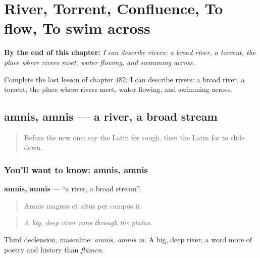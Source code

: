 
\chapter{River, Torrent, Confluence, To flow, To swim across}
\label{ch:la-river-torrent-confluence-to-flow-to-swim-across}

\begin{chapteropening}
\textbf{By the end of this chapter:} \emph{I can describe rivers: a broad river, a torrent, the place where rivers meet, water flowing, and swimming across.}

Complete the last lesson of chapter 482: I can describe rivers: a broad river, a torrent, the place where rivers meet, water flowing, and swimming across.
\end{chapteropening}

\section[amnis, amnis]{amnis, amnis — a river, a broad stream}

\label{lesson:LA-C482-amnis}



\begin{quote}
Before the new one: say the Latin for rough, then the Latin for to slide down.
\end{quote}

\subsection*{You'll want to know: amnis, amnis}
\textbf{amnis, amnis} — \textquotedblleft{}a river, a broad stream\textquotedblright{}.

\begin{quote}
Amnis magnus et altus per campōs it.
\end{quote}

\begin{quote}
\emph{A big, deep river runs through the plains.}
\end{quote}

Third declension, masculine: \emph{amnis, amnis m.} A big, deep river, a word more of poetry and history than \emph{flūmen}.


